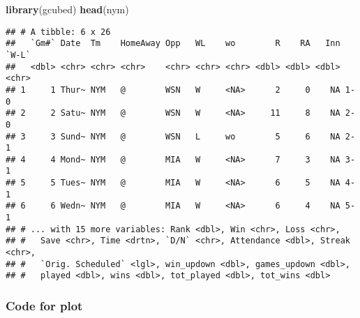 \documentclass[]{book}
\newenvironment{Shaded}{\begin{snugshade}}{\end{snugshade}}
\newcommand{\KeywordTok}[1]{\textcolor[rgb]{0.13,0.29,0.53}{\textbf{#1}}}
\newcommand{\NormalTok}[1]{#1}
\begin{document}
\begin{Shaded}
\begin{Highlighting}[]
\KeywordTok{library}\NormalTok{(gcubed)}
\KeywordTok{head}\NormalTok{(nym)}
\end{Highlighting}
\end{Shaded}

\begin{verbatim}
## # A tibble: 6 x 26
##   `Gm#` Date  Tm    HomeAway Opp   WL    wo        R    RA   Inn `W-L`
##   <dbl> <chr> <chr> <chr>    <chr> <chr> <chr> <dbl> <dbl> <dbl> <chr>
## 1     1 Thur~ NYM   @        WSN   W     <NA>      2     0    NA 1-0  
## 2     2 Satu~ NYM   @        WSN   W     <NA>     11     8    NA 2-0  
## 3     3 Sund~ NYM   @        WSN   L     wo        5     6    NA 2-1  
## 4     4 Mond~ NYM   @        MIA   W     <NA>      7     3    NA 3-1  
## 5     5 Tues~ NYM   @        MIA   W     <NA>      6     5    NA 4-1  
## 6     6 Wedn~ NYM   @        MIA   W     <NA>      6     4    NA 5-1  
## # ... with 15 more variables: Rank <dbl>, Win <chr>, Loss <chr>,
## #   Save <chr>, Time <drtn>, `D/N` <chr>, Attendance <dbl>, Streak <chr>,
## #   `Orig. Scheduled` <lgl>, win_updown <dbl>, games_updown <dbl>,
## #   played <dbl>, wins <dbl>, tot_played <dbl>, tot_wins <dbl>
\end{verbatim}

\hypertarget{metsbarcode}{%
\subsubsection*{Code for plot}\label{metsbarcode}}
\end{document}
